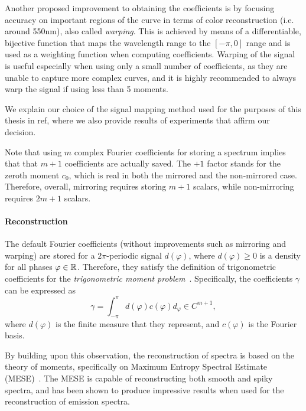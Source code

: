 Another proposed improvement to obtaining the coefficients is by focusing accuracy on important regions of the curve in terms of color reconstruction (i.e. around 550nm), also called \emph{warping}. This is achieved by means of a differentiable, bijective function that maps the wavelength range to the $[-\pi, 0]$ range and is used as a weighting function when computing coefficients. Warping of the signal is useful especially when using only a small number of coefficients, as they are unable to capture more complex curves, and it is highly recommended to always warp the signal if using less than 5 moments.

We explain our choice of the signal mapping method used for the purposes of this thesis in ref, where we also provide results of experiments that affirm our decision.

Note that using $m$ complex Fourier coefficients for storing a spectrum implies that that $m+1$ coefficients are actually saved. The $+1$ factor stands for the zeroth moment $c_0$, which is real in both the mirrored and the non-mirrored case. Therefore, overall, mirroring requires storing $m+1$ scalars, while non-mirroring requires $2m+1$ scalars.

\paragraph{Reconstruction} 

The default Fourier coefficients (without improvements such as mirroring and warping) are stored for a $2\pi$-periodic signal $d(\varphi)$, where $d(\varphi) \ge 0$ is a density for all phases $\varphi \in \mathbb{R}$. Therefore, they satisfy the definition of trigonometric coefficients for the \emph{trigonometric moment problem}~\cite{trigonometricMomentProblemDefiniton}. Specifically, the coefficients $\gamma$ can be expressed as
\begin{equation} \label{trigonometricCoeffsComputation}
\gamma = \int_{-\pi}^{\pi} d(\varphi) c(\varphi)d_\varphi \in C^{m+1},
\end{equation}
where $d(\varphi)$ is the finite measure that they represent, and $c(\varphi)$ is the Fourier basis.

By building upon this observation, the reconstruction of spectra is based on the theory of moments, specifically on Maximum Entropy Spectral Estimate (MESE)~\cite{unboundedMESEoriginal}. The MESE is capable of reconstructing both smooth and spiky spectra, and has been shown to produce impressive results when used for the reconstruction of emission spectra.

